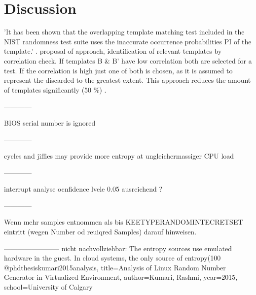 \section{Discussion}

'It has been shown that the overlapping template matching test included in the NIST randomness test suite uses the inaccurate occurrence probabilities PI of the template.'
\cite{hamano2007correction,chen2016templates}. \cite{chen2016templates} proposal of approach, identification of relevant templates by correlation check. If templates B \&  B' have low correlation
both are selected for a test. If the correlation is high just one of both is chosen, as it is assumed to represent the discarded to the greatest extent. This approach reduces the amount of templates significantly (50 \%) \cite{chen2016templates}.

------------

BIOS serial number is ignored

------------

cycles and jiffies may provide more entropy at ungleichermassiger CPU load

------------

interrupt analyse ocnfidence lvele 0.05 ausreichend ?

------------

 Wenn mehr samples entnommen als bis KEETYPERANDOMINTECRETSET eintritt (wegen Number od reuiqred Samples) darauf hinweisen.
 
 ------------------------
 nicht nachvollziehbar:
  The entropy sources use emulated hardware in the guest. In cloud systems, the only source of entropy(100%
 @phdthesis{kumari2015analysis,
     title={Analysis of Linux Random Number Generator in Virtualized Environment},
     author={Kumari, Rashmi},
     year={2015},
     school={University of Calgary}
 }
 
